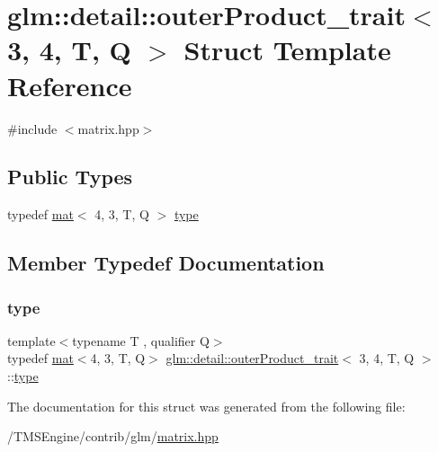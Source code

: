 \hypertarget{structglm_1_1detail_1_1outer_product__trait_3_013_00_014_00_01_t_00_01_q_01_4}{}\section{glm\+:\+:detail\+:\+:outer\+Product\+\_\+trait$<$ 3, 4, T, Q $>$ Struct Template Reference}
\label{structglm_1_1detail_1_1outer_product__trait_3_013_00_014_00_01_t_00_01_q_01_4}


{\ttfamily \#include $<$matrix.\+hpp$>$}

\subsection*{Public Types}
\begin{DoxyCompactItemize}
\item 
typedef \hyperlink{structglm_1_1mat}{mat}$<$ 4, 3, T, Q $>$ \hyperlink{structglm_1_1detail_1_1outer_product__trait_3_013_00_014_00_01_t_00_01_q_01_4_a49854a641e22e4e4e6dce870f1baec2c}{type}
\end{DoxyCompactItemize}


\subsection{Member Typedef Documentation}
\mbox{\label{structglm_1_1detail_1_1outer_product__trait_3_013_00_014_00_01_t_00_01_q_01_4_a49854a641e22e4e4e6dce870f1baec2c}} 
\subsubsection{\texorpdfstring{type}{type}}
{\footnotesize\ttfamily template$<$typename T , qualifier Q$>$ \\
typedef \hyperlink{structglm_1_1mat}{mat}$<$4, 3, T, Q$>$ \hyperlink{structglm_1_1detail_1_1outer_product__trait}{glm\+::detail\+::outer\+Product\+\_\+trait}$<$ 3, 4, T, Q $>$\+::\hyperlink{structglm_1_1detail_1_1outer_product__trait_3_013_00_014_00_01_t_00_01_q_01_4_a49854a641e22e4e4e6dce870f1baec2c}{type}}



The documentation for this struct was generated from the following file\+:\begin{DoxyCompactItemize}
\item 
/\+T\+M\+S\+Engine/contrib/glm/\hyperlink{matrix_8hpp}{matrix.\+hpp}\end{DoxyCompactItemize}
